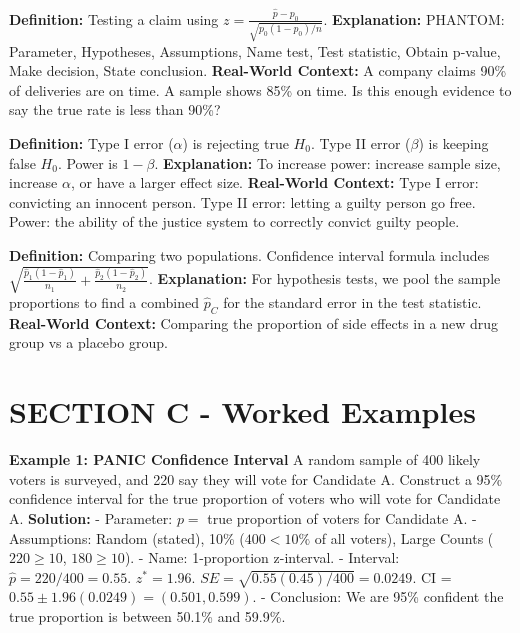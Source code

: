 \begin{lessonbox}
\textbf{Definition:} Testing a claim using $z = \frac{\hat{p} - p_0}{\sqrt{p_0(1-p_0)/n}}$.
\textbf{Explanation:} PHANTOM: Parameter, Hypotheses, Assumptions, Name test, Test statistic, Obtain p-value, Make decision, State conclusion.
\textbf{Real-World Context:} A company claims 90\% of deliveries are on time. A sample shows 85\% on time. Is this enough evidence to say the true rate is less than 90\%?
\end{lessonbox}

\begin{lessonbox}
\textbf{Definition:} Type I error ($\alpha$) is rejecting true $H_0$. Type II error ($\beta$) is keeping false $H_0$. Power is $1 - \beta$.
\textbf{Explanation:} To increase power: increase sample size, increase $\alpha$, or have a larger effect size.
\textbf{Real-World Context:} Type I error: convicting an innocent person. Type II error: letting a guilty person go free. Power: the ability of the justice system to correctly convict guilty people.
\end{lessonbox}

\begin{lessonbox}
\textbf{Definition:} Comparing two populations. Confidence interval formula includes $\sqrt{\frac{\hat{p}_1(1-\hat{p}_1)}{n_1} + \frac{\hat{p}_2(1-\hat{p}_2)}{n_2}}$.
\textbf{Explanation:} For hypothesis tests, we pool the sample proportions to find a combined $\hat{p}_C$ for the standard error in the test statistic.
\textbf{Real-World Context:} Comparing the proportion of side effects in a new drug group vs a placebo group.
\end{lessonbox}

\section{SECTION C - Worked Examples}

\textbf{Example 1: PANIC Confidence Interval}
A random sample of 400 likely voters is surveyed, and 220 say they will vote for Candidate A. Construct a 95\% confidence interval for the true proportion of voters who will vote for Candidate A.
\textbf{Solution:}
- Parameter: $p = $ true proportion of voters for Candidate A.
- Assumptions: Random (stated), 10\% ($400 < 10\%$ of all voters), Large Counts ($220 \geq 10$, $180 \geq 10$).
- Name: 1-proportion z-interval.
- Interval: $\hat{p} = 220/400 = 0.55$. $z^* = 1.96$. $SE = \sqrt{0.55(0.45)/400} = 0.0249$. CI = $0.55 \pm 1.96(0.0249) = (0.501, 0.599)$.
- Conclusion: We are 95\% confident the true proportion is between 50.1\% and 59.9\%.

